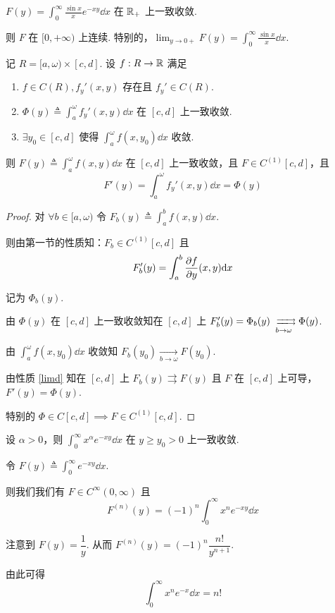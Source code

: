 \begin{example}
    $F(y)=\displaystyle\int_0^\infty\frac{\sin x}{x}e^{-xy}\dd x$ 在 $\mathbb{R}_+$ 上一致收敛.

    则 $F$ 在 $[0,+\infty)$ 上连续. 特别的，$\displaystyle\lim_{y\to 0+}F(y)=\int_0^\infty\frac{\sin x}{x}\dd x$.
\end{example}


\begin{property}
    记 $R=[a,\omega)\times [c,d]$. 设 $f:R\to\mathbb{R}$ 满足

    \begin{enumerate}
        \item $f\in C(R),f_y'(x,y)$ 存在且 $f_y'\in C(R)$.
        
        \item $\Phi(y)\triangleq\displaystyle\int_a^\omega f_y'(x,y)\dd x$ 在 $[c,d]$ 上一致收敛.
        
        \item $\exists y_0\in[c,d]$ 使得 $\displaystyle\int_a^\omega f(x,y_0)\dd x$ 收敛.
    \end{enumerate}

    则 $F(y)\triangleq\displaystyle\int_a^\omega f(x,y)\dd x$ 在 $[c,d]$ 上一致收敛，且 $F\in C^{(1)}[c,d]$，且
$$
F'(y)=\int_a^\omega f_y'(x,y)\dd x=\Phi(y)
$$
\end{property}
\begin{proof}
    对 $\forall b\in [a,\omega)$ 令 $F_b(y)\triangleq\displaystyle\int_a^b f(x,y)\dd x$.

    则由第一节的性质知：$F_b\in C^{(1)}[c,d]$ 且
$$
F_b'(y)=\int_a^b\frac{\partial{f}}{\partial{y}}(x,y)\mathrm{d} x
$$

    记为 $\Phi_b(y)$.

    由 $\Phi(y)$ 在 $[c,d]$ 上一致收敛知在 $[c,d]$ 上 $F_b'(y)=\Phi_b(y)\xrightrightarrows[b\to\omega]{}\Phi(y)$.

    由 $\displaystyle\int_a^\omega f(x,y_0)\dd x$ 收敛知 $F_b(y_0)\xrightarrow[b\to\omega]{}F(y_0)$.

    由性质 \ref{limd} 知在 $[c,d]$ 上 $F_b(y)\rightrightarrows F(y)$ 且 $F$ 在 $[c,d]$ 上可导，$F'(y)=\Phi(y)$.

    特别的 $\Phi\in C[c,d]\implies F\in C^{(1)}[c,d]$.
\end{proof}

\begin{example}
    设 $\alpha>0$，则 $\displaystyle\int_0^\infty x^\alpha e^{-xy}\dd x$ 在 $y\ge y_0>0$ 上一致收敛.

    令 $F(y)\triangleq\displaystyle\int_0^\infty e^{-xy}\dd x$.

    则我们我们有 $F\in C^\infty(0,\infty)$ 且
$$
F^{(n)}(y)=(-1)^n\int_0^\infty x^ne^{-xy}\dd x
$$

    注意到 $F(y)=\dfrac{1}{y}$. 从而 $F^{(n)}(y)=(-1)^n\dfrac{n!}{y^{n+1}}$.

    由此可得
$$
\int_0^\infty x^ne^{-x}\dd x=n!
$$
\end{example}

